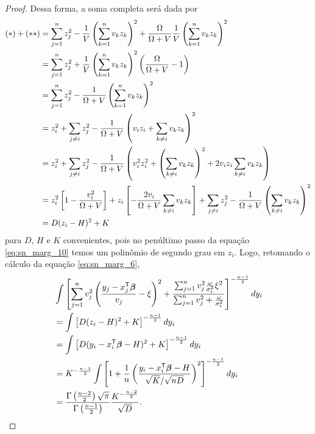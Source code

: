 \begin{proof}
Dessa forma, a soma completa será dada por
\begin{align}\label{eq:sn_marg_10}
(*)+(**) & = \sum_{j=1}^nz_j^2 -\frac{1}{V}\left(\sum_{k=1}^nv_kz_k\right)^2  + \frac{\Omega}{\Omega + V}\frac{1}{V}  \left(\sum_{k=1}^nv_kz_k\right)^2 \notag \\
{} & = \sum_{j=1}^nz_j^2 + \frac{1}{V}\left(\sum_{k=1}^nv_kz_k\right)^2\left(\frac{\Omega}{\Omega + V} - 1\right) \notag \\
{} & = \sum_{j=1}^nz_j^2 - \frac{1}{\Omega + V}\left(\sum_{k=1}^nv_kz_k\right)^2 \notag \\
{} & = z_i^2 + \sum_{j\neq i}z_j^2 - \frac{1}{\Omega + V}\left(v_iz_i + \sum_{k\neq i} v_kz_k\right)^2 \notag \\
{} & = z_i^2 + \sum_{j\neq i}z_j^2 - \frac{1}{\Omega + V}\left(v_i^2z_i^2 + \left(\sum_{k\neq i} v_kz_k\right)^2 +2v_iz_i\sum_{k\neq i} v_kz_k\right) \notag \\
{} & = z_i^2\left[1-\frac{v_i^2}{\Omega + V}\right] + z_i\left[-\frac{2v_i}{\Omega + V}\sum_{k\neq i} v_kz_k\right] + \sum_{j\neq i}z_j^2 - \frac{1}{\Omega + V}\left(\sum_{k\neq i} v_kz_k\right)^2 \notag \\
{} & = D(z_i - H)^2+K
\end{align}
para $D$, $H$ e $K$ convenientes, pois no penúltimo passo da equação \eqref{eq:sn_marg_10} temos um polinômio de segundo grau em $z_i$. Logo, retomando o cálculo da equação \eqref{eq:sn_marg_6},
\begin{equation}\label{eq:sn_marg_11}
\begin{split}
& \int \left[\sum_{j=1}^nv_j^2\left(\frac{y_j-x_j^{\mathsf{T}}{\boldsymbol{\beta}}}{v_j} - \xi\right)^2 + \frac{\sum_{j=1}^nv_j^2\frac{\omega}{\sigma^2_t}\xi^2}{\sum_{j=1}^nv_j^2+\frac{\omega}{\sigma^2_t}}\right]^{-\frac{n-1}{2}}dy_i \\
& = \int\left[D(z_i - H)^2+K\right]^{-\frac{n-1}{2}} dy_i \\
& = \int\left[D(y_i - x_i^{\mathsf{T}}{\boldsymbol{\beta}} - H)^2+K\right]^{-\frac{n-1}{2}} dy_i\\
& = K^{-\frac{n-1}{2}}\int\left[1+\frac{1}{n}\left(\frac{y_i-x_i^{\mathsf{T}}{\boldsymbol{\beta}}-H}{\sqrt{K}/\sqrt{nD}}\right)^2\right]^{-\frac{n-1}{2}}dy_i \\
& = \frac{\Gamma\left(\frac{n-2}{2}\right)\sqrt{\pi}}{\Gamma\left(\frac{n-1}{2}\right)}\frac{K^{-\frac{n-2}{2}}}{\sqrt{D}}.
\end{split}
\end{equation}


\end{proof}
